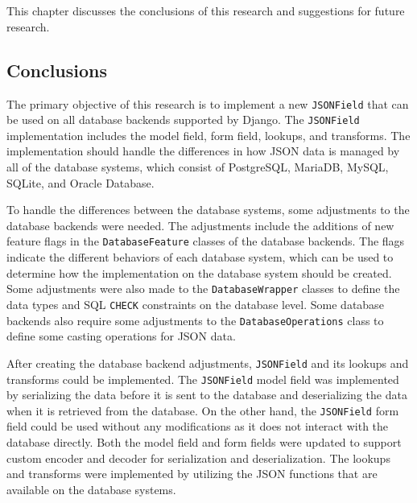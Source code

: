 \chapter{\kesimpulan}
This chapter discusses the conclusions of this research and suggestions for
future research.

\section{Conclusions}

The primary objective of this research is to implement a new \verb|JSONField|
that can be used on all database backends supported by Django. The
\verb|JSONField| implementation includes the model field, form field, lookups,
and transforms. The implementation should handle the differences in how JSON
data is managed by all of the database systems, which consist of PostgreSQL,
MariaDB, MySQL, SQLite, and Oracle Database.

To handle the differences between the database systems, some adjustments to the
database backends were needed. The adjustments include the additions of new
feature flags in the \verb|DatabaseFeature| classes of the database backends.
The flags indicate the different behaviors of each database system, which can
be used to determine how the implementation on the database system should be
created. Some adjustments were also made to the \verb|DatabaseWrapper| classes
to define the data types and SQL \verb|CHECK| constraints on the database
level. Some database backends also require some adjustments to the
\verb|DatabaseOperations| class to define some casting operations for JSON
data.

After creating the database backend adjustments, \verb|JSONField| and its
lookups and transforms could be implemented. The \verb|JSONField| model field
was implemented by serializing the data before it is sent to the database and
deserializing the data when it is retrieved from the database. On the other
hand, the \verb|JSONField| form field could be used without any modifications
as it does not interact with the database directly. Both the model field and
form fields were updated to support custom encoder and decoder for
serialization and deserialization. The lookups and transforms were implemented
by utilizing the JSON functions that are available on the database systems.

